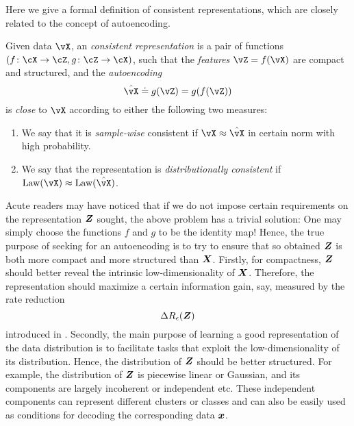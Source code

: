 \documentclass[../../book-main.tex]{subfiles}
\begin{document}
Here we give a formal definition of consistent representations, which
are closely related to the concept of autoencoding. %
\begin{definition}\label{def:bidirectional_rep}
  Given data \(\vX\), an \textit{consistent representation} is a pair
  of functions \((f \colon \cX \to \cZ, g \colon \cZ \to \cX)\), such
  that the \textit{features} \(\vZ = f(\vX)\) are compact and
  structured, and the \textit{autoencoding} \[\hat{\vX} \doteq g(\vZ)
  = g(f(\vZ))\] is \textit{close} to \(\vX\) according to either the
  following two measures:
  \begin{enumerate}
    \item We say that it is \textit{sample-wise} consistent if \(\vX
      \approx \hat{\vX}\) in certain norm with high probability.
    \item We say that the representation is \textit{distributionally
      consistent} if \(\Law(\vX) \approx \Law(\hat{\vX})\).
  \end{enumerate}
\end{definition}

Acute readers may have noticed that if we do not impose certain
requirements on the representation $\bm{Z}$ sought, the above problem has
a trivial solution: One may simply choose the functions $f$ and $g$
to be the identity map! Hence, the true purpose of seeking for an
autoencoding is to try to ensure that so obtained $\bm{Z}$ is both more
compact and more structured than $\bm{X}$. Firstly, for compactness, $\bm{Z}$
should better reveal the intrinsic low-dimensionality of $\bm{X}$.
Therefore, the representation should maximize a certain information
gain, say, measured by the rate reduction
\begin{equation}
  \Delta R_{\epsilon}(\bm{Z})
\end{equation}
introduced in . Secondly, the main purpose of
learning a good representation of the data distribution is to
facilitate tasks that exploit the low-dimensionality of its
distribution. Hence, the distribution of $\bm{Z}$ should be better
structured. For example, the distribution of $\bm{Z}$ is piecewise linear
or Gaussian, and its components are largely incoherent or independent
etc. These independent components can represent different clusters or
classes and can also be easily used as conditions for decoding the
corresponding data $\bm{x}$.
\end{document}
